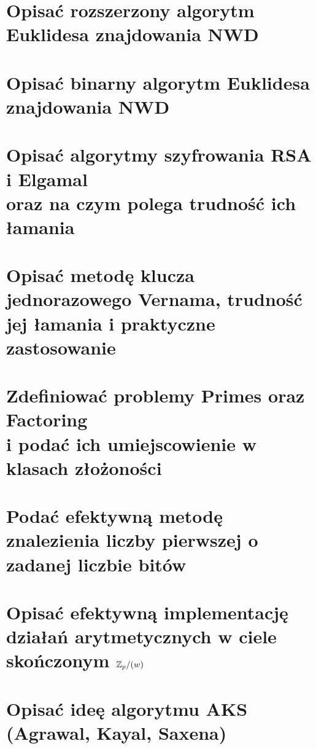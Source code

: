 \section{Opisać rozszerzony algorytm Euklidesa znajdowania NWD}


\section{Opisać binarny algorytm Euklidesa znajdowania NWD}


\section{Opisać algorytmy szyfrowania RSA i Elgamal \\ oraz na czym polega trudność ich łamania}


\section{Opisać metodę klucza jednorazowego Vernama, trudność jej łamania i praktyczne zastosowanie}


\section{Zdefiniować problemy Primes oraz Factoring \\ i podać ich umiejscowienie w klasach złożoności}


\section{Podać efektywną metodę znalezienia liczby pierwszej o zadanej liczbie bitów}


\section{Opisać efektywną implementację działań arytmetycznych w ciele skończonym \( \mathbb{Z}_p/(w) \)}


\section{Opisać ideę algorytmu AKS (Agrawal, Kayal, Saxena)}


